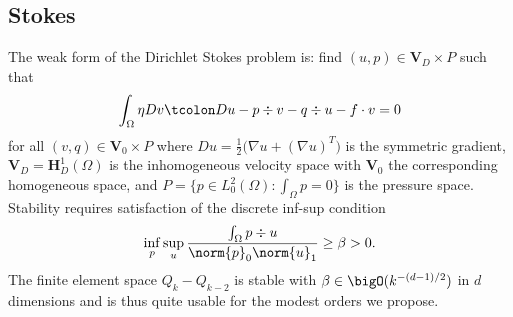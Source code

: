 \subsection{Stokes}\label{sec:jscstokes}
The weak form of the Dirichlet Stokes problem is: find $(u,p) \in \bm V_D \times P$ such that
\begin{equation*}
  \int_\Omega \eta Dv \tcolon Du - p \div v - q\div u - f\cdot v = 0
\end{equation*}
for all $(v,q) \in \bm V_0 \times P$ where $Du = \frac 1 2 \big(\nabla u + (\nabla u)^T \big)$ is the symmetric
gradient, $\bm V_D = \bm H^1_D(\Omega)$ is the inhomogeneous velocity space with $\bm V_0$ the corresponding homogeneous
space, and $P = \{p \in L^2_0(\Omega) : \int_\Omega p = 0 \}$ is the pressure space.  Stability requires satisfaction of
the discrete inf-sup condition
\begin{equation*}
  \inf_{p} \sup_{u} \frac{\int_\Omega p \div u}{\norm{p}_{0} \norm{u}_1} \ge \beta > 0 .
\end{equation*}
The finite element space $Q_k-Q_{k-2}$ is stable with $\beta \in \bigO(k^{-(d-1)/2})$ in $d$ dimensions \citep[see][]{schotzau1998mhf} and is thus quite usable for the modest orders we propose.


